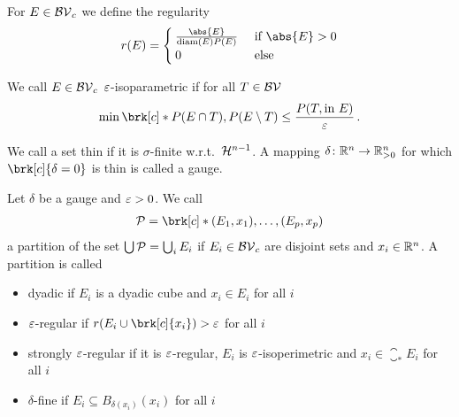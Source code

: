 \begin{frame}
	\begin{definition}
	For $E\in \mathcal{BV}_c$ we define the regularity
	\begin{align*}
		r(E)=\begin{cases}
			\frac{\abs{E}}{\diam(E)P(E)} &\text{ if }\abs{E}>0 \\
			0 &\text{ else}
		\end{cases}
	\end{align*}
	\end{definition}
	\begin{definition}[$\e$-isoparametric]
	We call $E\in\mathcal{BV}_c$ $\e$-isoparametric if for all $T\in\mathcal{BV}$
	\begin{align*}
		\min\brk[c]*{P(E\cap T),P(E\setminus T)}\leq \frac{P(T,\text{in }E)}{\e}\,.
	\end{align*}
	\end{definition}
	\begin{definition}[Gauge]
	We call a set thin if it is $\sigma$-finite w.r.t.\ $\mathcal{H}^{n-1}$. A mapping $\delta\colon\mathbb{R}^n\to\mathbb{R}^n_{>0}$ for which $\brk[c]{\delta=0}$ is thin is called a gauge.
	\end{definition}
\end{frame}

\begin{frame}
	\begin{definition}[Partitions]
	Let $\delta$ be a gauge and $\varepsilon>0$.
	We call
	\begin{align*}
		\cP=\brk[c]*{(E_1,x_1),\dots, (E_p,x_p)}
	\end{align*}
	a partition of the set $\bigcup\mathcal{P}=\bigcup_iE_i$ if $E_i\in\mathcal{BV}_c$ are disjoint sets and $x_i\in\mathbb{R}^n$. A partition is called
	\begin{itemize}
		\item dyadic if $E_i$ is a dyadic cube and $x_i\in E_i$ for all $i$
		\item $\e$-regular if $r(E_i\cup\brk[c]{x_i})>\e$ for all $i$
		\item strongly $\e$-regular if it is $\e$-regular, $E_i$ is $\e$-isoperimetric and $x_i\in\closure_*E_i$ for all $i$
		\item $\delta$-fine if $E_i\subseteq B_{\delta(x_i)}(x_i)$ for all $i$
	\end{itemize}
	\end{definition}
\end{frame}

